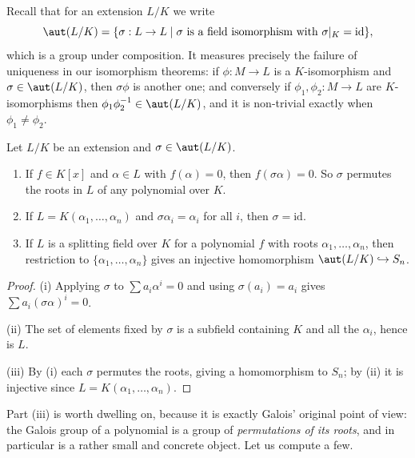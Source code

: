 \documentclass[a4paper]{scrartcl}
\begin{document}
Recall that for an extension $L/K$ we write
$$\aut(L/K) = \{\sigma : L \to L \mid \sigma \text{ is a field isomorphism with } \sigma|_K = \mathrm{id}\},$$
which is a group under composition. It measures precisely the failure of uniqueness in our isomorphism theorems: if $\phi : M \to L$ is a $K$-isomorphism and $\sigma \in \aut(L/K)$, then $\sigma\phi$ is another one; and conversely if $\phi_1, \phi_2 : M \to L$ are $K$-isomorphisms then $\phi_1\phi_2^{-1} \in \aut(L/K)$, and it is non-trivial exactly when $\phi_1 \neq \phi_2$.

\begin{lemma}\label{lem:autbasic}
	Let $L/K$ be an extension and $\sigma \in \aut(L/K)$.
	\begin{enumerate}[label=(\roman*)]
		\item If $f \in K[x]$ and $\alpha \in L$ with $f(\alpha) = 0$, then $f(\sigma\alpha) = 0$. So $\sigma$ permutes the roots in $L$ of any polynomial over $K$.
		\item If $L = K(\alpha_1, \dots, \alpha_n)$ and $\sigma\alpha_i = \alpha_i$ for all $i$, then $\sigma = \mathrm{id}$.
		\item If $L$ is a splitting field over $K$ for a polynomial $f$ with roots $\alpha_1, \dots, \alpha_n$, then restriction to $\{\alpha_1,\dots,\alpha_n\}$ gives an injective homomorphism $\aut(L/K) \hookrightarrow S_n$.
	\end{enumerate}
\end{lemma}

\begin{proof}
	(i) Applying $\sigma$ to $\sum a_i \alpha^i = 0$ and using $\sigma(a_i) = a_i$ gives $\sum a_i (\sigma\alpha)^i = 0$.

	(ii) The set of elements fixed by $\sigma$ is a subfield containing $K$ and all the $\alpha_i$, hence is $L$.

	(iii) By (i) each $\sigma$ permutes the roots, giving a homomorphism to $S_n$; by (ii) it is injective since $L = K(\alpha_1,\dots,\alpha_n)$.
\end{proof}

Part (iii) is worth dwelling on, because it is exactly Galois' original point of view: the Galois group of a polynomial is a group of \emph{permutations of its roots}, and in particular is a rather small and concrete object. Let us compute a few.
\end{document}
